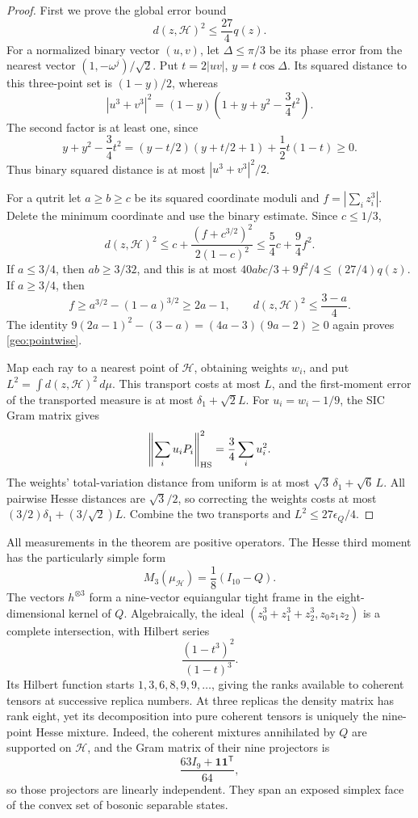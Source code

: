 \begin{proof}
First we prove the global error bound
\begin{equation}
 d(z,\mathcal H)^2\le\frac{27}{4}q(z).
 \label{geo:pointwise}
\end{equation}
For a normalized binary vector \((u,v)\), let \(\Delta\le\pi/3\) be its
phase error from the nearest vector \((1,-\omega^j)/\sqrt2\).
Put \(t=2|uv|\), \(y=t\cos\Delta\). Its squared distance to this
three-point set is \((1-y)/2\), whereas
\[
 |u^3+v^3|^2
 =(1-y)\left(1+y+y^2-\frac34t^2\right).
\]
The second factor is at least one, since
\[
 y+y^2-\frac34t^2
 =(y-t/2)(y+t/2+1)+\frac12t(1-t)\ge0.
\]
Thus binary squared distance is at most \(|u^3+v^3|^2/2\).

For a qutrit let \(a\ge b\ge c\) be its squared coordinate moduli and
\(f=|\sum_i z_i^3|\). Delete the minimum coordinate and use the binary
estimate. Since \(c\le1/3\),
\[
 d(z,\mathcal H)^2
 \le c+\frac{(f+c^{3/2})^2}{2(1-c)^2}
 \le\frac54c+\frac94f^2.
\]
If \(a\le3/4\), then \(ab\ge3/32\), and this is at most
\(40abc/3+9f^2/4\le(27/4)q(z)\).
If \(a\ge3/4\), then
\[
 f\ge a^{3/2}-(1-a)^{3/2}\ge2a-1,\qquad
 d(z,\mathcal H)^2\le\frac{3-a}{4}.
\]
The identity
\(9(2a-1)^2-(3-a)=(4a-3)(9a-2)\ge0\) again proves
\eqref{geo:pointwise}.

Map each ray to a nearest point of \(\mathcal H\), obtaining weights
\(w_i\), and put \(L^2=\int d(z,\mathcal H)^2\,d\mu\).
This transport costs at most \(L\), and the first-moment error of the
transported measure is at most \(\delta_1+\sqrt2L\).
For \(u_i=w_i-1/9\), the SIC Gram matrix gives
\[
 \left\|\sum_i u_iP_i\right\|_{\rm HS}^2=\frac34\sum_i u_i^2.
\]
The weights' total-variation distance from uniform is at most
\(\sqrt3\,\delta_1+\sqrt6\,L\).
All pairwise Hesse distances are \(\sqrt3/2\), so correcting the weights
costs at most \((3/2)\delta_1+(3/\sqrt2)L\).
Combine the two transports and \(L^2\le27\epsilon_Q/4\).
\end{proof}

All measurements in the theorem are positive operators.
The Hesse third moment has the particularly simple form
\begin{equation}
 M_3(\mu_{\mathcal H})=\frac18(I_{10}-Q).
 \label{geo:hesse-third}
\end{equation}
The vectors \(h^{\otimes3}\) form a nine-vector equiangular tight frame
in the eight-dimensional kernel of \(Q\). Algebraically, the ideal
\((z_0^3+z_1^3+z_2^3,z_0z_1z_2)\) is a complete intersection, with
Hilbert series
\[
 \frac{(1-t^3)^2}{(1-t)^3}.
\]
Its Hilbert function starts \(1,3,6,8,9,9,\ldots\), giving the ranks
available to coherent tensors at successive replica numbers.
At three replicas the density matrix has rank eight, yet its
decomposition into pure coherent tensors is uniquely the nine-point
Hesse mixture. Indeed, the coherent mixtures annihilated by \(Q\) are
supported on \(\mathcal H\), and the Gram matrix of their nine
projectors is
\[
 \frac{63I_9+\mathbf1\mathbf1^{\mathsf T}}{64},
\]
so those projectors are linearly independent. They span an exposed
simplex face of the convex set of bosonic separable states.

